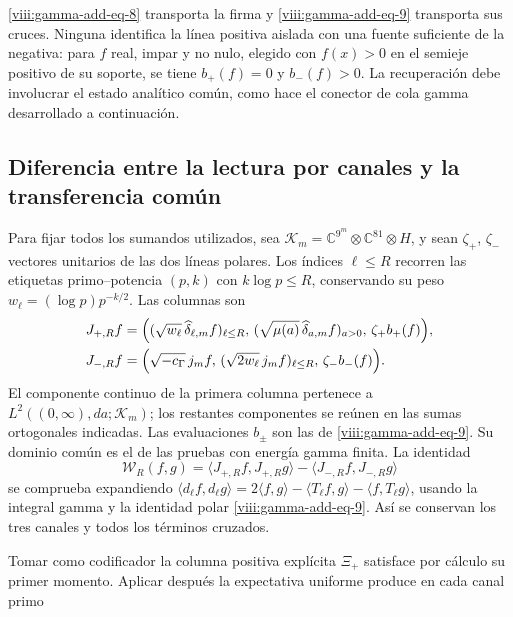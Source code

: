 \eqref{viii:gamma-add-eq-8} transporta la firma y \eqref{viii:gamma-add-eq-9} transporta sus cruces. Ninguna identifica la línea positiva aislada con una fuente suficiente de la negativa: para \(f\) real, impar y no nulo, elegido con \(f(x)>0\) en el semieje positivo de su soporte, se tiene \(b_+(f)=0\) y \(b_-(f)>0\). La recuperación debe involucrar el estado analítico común, como hace el conector de cola gamma desarrollado a continuación.

\subsection{Diferencia entre la lectura por canales y la transferencia común}
\label{viii:gamma-add-sub-259}

Para fijar todos los sumandos utilizados, sea
\(\mathcal K_m=\mathbb C^{9^m}\otimes\mathbb C^{81}\otimes H\),
y sean \(\zeta_+\), \(\zeta_-\) vectores unitarios de las dos
líneas polares. Los índices \(\ell\leq R\) recorren las etiquetas
primo--potencia \((p,k)\) con \(k\log p\leq R\), conservando
su peso \(w_\ell=(\log p)p^{-k/2}\). Las columnas son
\begin{equation}
\begin{aligned}
J_{+,R}f={}&\Bigl(
 (\sqrt{w_\ell}\,\widehat\delta_{\ell,m}f)_{\ell\leq R},\,
 (\sqrt{\mu(a)}\,\widehat\delta_{a,m}f)_{a>0},\,
 \zeta_+b_+(f)\Bigr),\\
J_{-,R}f={}&\Bigl(
 \sqrt{-c_\Gamma}\,j_mf,\,
 (\sqrt{2w_\ell}\,j_mf)_{\ell\leq R},\,
 \zeta_-b_-(f)\Bigr).
\end{aligned}
\label{viii:gamma-add-columnas-completas}
\end{equation}
El componente continuo de la primera columna pertenece a
\(L^2((0,\infty),da;\mathcal K_m)\); los restantes componentes
se reúnen en las sumas ortogonales indicadas. Las evaluaciones
\(b_\pm\) son las de \eqref{viii:gamma-add-eq-9}. Su dominio común
es el de las pruebas con energía gamma finita. La identidad
\begin{equation}
\mathscr W_R(f,g)
=\langle J_{+,R}f,J_{+,R}g\rangle
 -\langle J_{-,R}f,J_{-,R}g\rangle
\label{viii:gamma-add-diferencia-columnas}
\end{equation}
se comprueba expandiendo
\(\langle d_\ell f,d_\ell g\rangle
=2\langle f,g\rangle-\langle T_\ell f,g\rangle
-\langle f,T_\ell g\rangle\), usando la integral gamma
y la identidad polar \eqref{viii:gamma-add-eq-9}. Así se conservan
los tres canales y todos los términos cruzados.

Tomar como codificador la columna positiva explícita \(\Xi_+\) satisface por cálculo su primer momento. Aplicar después la expectativa uniforme produce en cada canal primo


